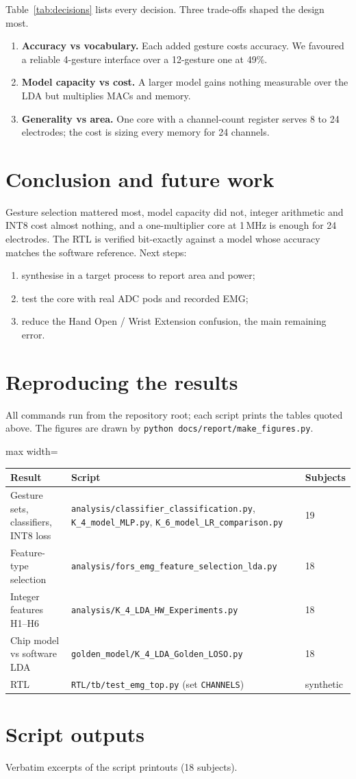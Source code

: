 \documentclass[11pt,a4paper]{article}
\begin{document}
Table~\ref{tab:decisions} lists every decision. Three trade-offs shaped the design most.
\begin{enumerate}
\item \textbf{Accuracy vs vocabulary.} Each added gesture costs accuracy. We favoured a reliable
4-gesture interface over a 12-gesture one at 49\%.
\item \textbf{Model capacity vs cost.} A larger model gains nothing measurable over the LDA but
multiplies MACs and memory.
\item \textbf{Generality vs area.} One core with a channel-count register serves 8 to 24 electrodes;
the cost is sizing every memory for 24 channels.
\end{enumerate}

\section{Conclusion and future work}
Gesture selection mattered most, model capacity did not, integer arithmetic and INT8 cost almost
nothing, and a one-multiplier core at 1\,MHz is enough for 24 electrodes. The RTL is verified
bit-exactly against a model whose accuracy matches the software reference. Next steps:
\begin{enumerate}
\item synthesise in a target process to report area and power;
\item test the core with real ADC pods and recorded EMG;
\item reduce the Hand Open / Wrist Extension confusion, the main remaining error.
\end{enumerate}

\appendix
\section{Reproducing the results}
All commands run from the repository root; each script prints the tables quoted above. The figures
are drawn by \texttt{python docs/report/make\_figures.py}.
\begin{center}\small
\begin{adjustbox}{max width=\linewidth}
\begin{tabular}{lll}\toprule
Result & Script & Subjects\\\midrule
Gesture sets, classifiers, INT8 loss & \texttt{analysis/classifier\_classification.py}, \texttt{K\_4\_model\_MLP.py}, \texttt{K\_6\_model\_LR\_comparison.py} & 19\\
Feature-type selection & \texttt{analysis/fors\_emg\_feature\_selection\_lda.py} & 18\\
Integer features H1--H6 & \texttt{analysis/K\_4\_LDA\_HW\_Experiments.py} & 18\\
Chip model vs software LDA & \texttt{golden\_model/K\_4\_LDA\_Golden\_LOSO.py} & 18\\
RTL & \texttt{RTL/tb/test\_emg\_top.py} (set \texttt{CHANNELS}) & synthetic\\\bottomrule
\end{tabular}\end{adjustbox}
\end{center}

\section{Script outputs}
Verbatim excerpts of the script printouts (18 subjects).
{\tiny}
\end{document}

